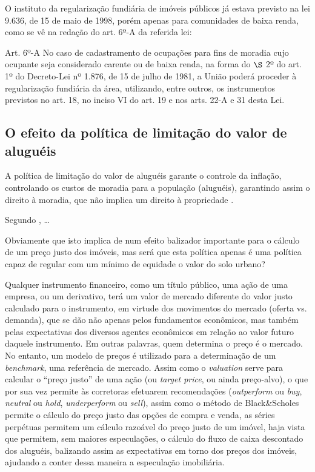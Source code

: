 \documentclass[
	12pt,				%
	oneside,			%
	a4paper,			%
	chapter=TITLE,		%
	section=TITLE,		%
	english,			%
	brazil				%
	]{abntex2}
\begin{document}
O instituto da regularização fundiária de imóveis públicos já estava previsto na
lei 9.636, de 15 de maio de 1998, porém apenas para comunidades de baixa renda,
como se vê na redação do art. 6º-A da referida lei:
\begin{citacao}
Art. 6º-A No caso de cadastramento de ocupações para fins de moradia cujo
ocupante seja considerado carente ou de baixa renda, na forma do $\S$ 2º do art.
1º do Decreto-Lei nº 1.876, de 15 de julho de 1981, a União poderá proceder à
regularização fundiária da área, utilizando, entre outros, os instrumentos
previstos no art. 18, no inciso VI do art. 19 e nos arts. 22-A e 31 desta Lei.
\end{citacao}
\hypertarget{o-efeito-da-poluxedtica-de-limitauxe7uxe3o-do-valor-de-aluguuxe9is}{%
\subsection{O efeito da política de limitação do valor de aluguéis}\label{o-efeito-da-poluxedtica-de-limitauxe7uxe3o-do-valor-de-aluguuxe9is}}

A política de limitação do valor de aluguéis garante o controle da inflação,
controlando os custos de moradia para a população (aluguéis), garantindo assim
o direito à moradia, que não implica um direito à propriedade \autocite{fnogueira}.

Segundo \textcite[p.~194-195]{shelter}, \ldots{}

Obviamente que isto implica de num efeito balizador importante para o cálculo de
um preço justo dos imóveis, mas será que esta política apenas é uma política
capaz de regular com um mínimo de equidade o valor do solo urbano?

Qualquer instrumento financeiro, como um título público, uma ação de uma
empresa, ou um derivativo, terá um valor de mercado diferente do valor justo
calculado para o instrumento, em virtude dos movimentos do mercado (oferta vs.
demanda), que se dão não apenas pelos fundamentos econômicos, mas também pelas
expectativas dos diversos agentes econômicos em relação ao valor futuro daquele
instrumento. Em outras palavras, quem determina o preço é o mercado. No entanto,
um modelo de preços é utilizado para a determinação de um \emph{benchmark}, uma
referência de mercado. Assim como o \emph{valuation} serve para calcular o ``preço
justo'' de uma ação (ou \emph{target price}, ou ainda preço-alvo), o que por sua vez
permite às corretoras efetuarem recomendações (\emph{outperform} ou \emph{buy}, \emph{neutral}
ou \emph{hold}, \emph{underperform} ou \emph{sell}), assim como o método de Black\&Scholes
\autocite{marins2} permite o cálculo do preço justo das opções de compra e venda, as
séries perpétuas permitem um cálculo razoável do preço justo de um imóvel, haja
vista que permitem, sem maiores especulações, o cálculo do fluxo de caixa
descontado dos aluguéis, balizando assim as expectativas em torno dos preços dos
imóveis, ajudando a conter dessa maneira a especulação imobiliária.
\end{document}
